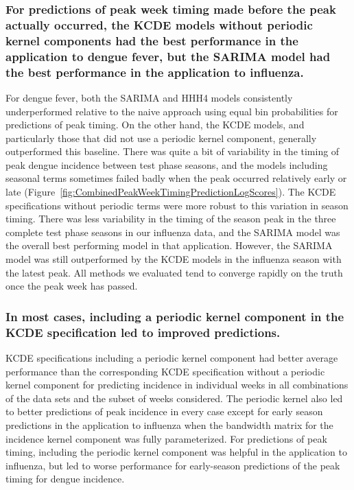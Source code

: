 \documentclass[times, doublespace]{simauth}\usepackage[]{graphicx}\usepackage[]{color}
\begin{document}





\subsubsection{For predictions of peak week timing made before the peak actually
occurred, the KCDE models without periodic kernel components had the best
performance in the application to dengue fever, but the SARIMA model had the
best performance in the application to influenza.}  For dengue fever, both the
SARIMA and HHH4 models consistently underperformed relative
to the naive approach using equal bin probabilities for predictions of peak
timing.  On the other hand, the KCDE models, and particularly those that did not
use a periodic kernel component, generally outperformed this baseline.  There
was quite a bit of variability in the timing of peak dengue incidence between
test phase seasons, and the models including seasonal terms sometimes failed
badly when the peak occurred relatively early or late
(Figure~\ref{fig:CombinedPeakWeekTimingPredictionLogScores}).  The KCDE
specifications without periodic terms were more robust to this variation in
season timing.  There was less variability in the timing of the season peak in
the three complete test phase seasons in our influenza data, and the SARIMA
model was the overall best performing model in that application.  However, the
SARIMA model was still outperformed by the KCDE models in the influenza season
with the latest peak.  All methods we evaluated tend to converge rapidly on the
truth once the peak week has passed.

\subsubsection{In most cases, including a periodic kernel component in the KCDE specification led to improved predictions.}  KCDE specifications including a periodic kernel component had better average performance than the corresponding KCDE specification without a periodic kernel component for predicting incidence in individual weeks in all combinations of the data sets and the subset of weeks considered.  The periodic kernel also led to better predictions of peak incidence in every case except for early season predictions in the application to influenza when the bandwidth matrix for the incidence kernel component was fully parameterized.  For predictions of peak timing, including the periodic kernel component was helpful in the application to influenza, but led to worse performance for early-season predictions of the peak timing for dengue incidence.
\end{document}

